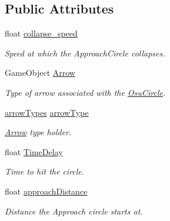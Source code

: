 \subsection*{Public Attributes}
\begin{DoxyCompactItemize}
\item 
float \hyperlink{class_osu_circle_aaf07a385b1c32a713145d07dbaf9c5d0}{collapse\+\_\+speed}
\begin{DoxyCompactList}\small\item\em Speed at which the Approach\+Circle collapses. \end{DoxyCompactList}\item 
\mbox{\label{class_osu_circle_abc723e35c4cd1c869fed1f2be58711fa}} 
Game\+Object \hyperlink{class_osu_circle_abc723e35c4cd1c869fed1f2be58711fa}{Arrow}
\begin{DoxyCompactList}\small\item\em Type of arrow associated with the \hyperlink{class_osu_circle}{Osu\+Circle}. \end{DoxyCompactList}\item 
\mbox{\label{class_osu_circle_abf7710df78d144e2bbbf2ee514ba1f02}} 
\hyperlink{class_osu_circle_af50d7f27362dacb1dc3b3825cee7f837}{arrow\+Types} \hyperlink{class_osu_circle_abf7710df78d144e2bbbf2ee514ba1f02}{arrow\+Type}
\begin{DoxyCompactList}\small\item\em \hyperlink{class_arrow}{Arrow} type holder. \end{DoxyCompactList}\item 
\mbox{\label{class_osu_circle_a9fe96e2fefe4e4bb189bbd6d276aeb34}} 
float \hyperlink{class_osu_circle_a9fe96e2fefe4e4bb189bbd6d276aeb34}{Time\+Delay}
\begin{DoxyCompactList}\small\item\em Time to hit the circle. \end{DoxyCompactList}\item 
\mbox{\label{class_osu_circle_a8e9ec841a5fbf5928ea676f1ba89a5e8}} 
float \hyperlink{class_osu_circle_a8e9ec841a5fbf5928ea676f1ba89a5e8}{approach\+Distance}
\begin{DoxyCompactList}\small\item\em Distance the Approach circle starts at. \end{DoxyCompactList}\item 

\end{DoxyCompactItemize}
